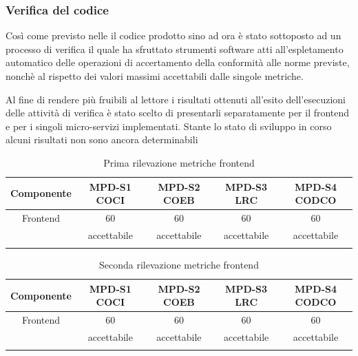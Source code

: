 \subsubsection{Verifica del codice}
Così come previsto nelle  il codice prodotto sino ad ora è stato sottoposto ad un processo di verifica il quale 
ha sfruttato strumenti software atti all'espletamento automatico delle operazioni di accertamento della conformità alle norme previste, nonchè
al rispetto dei valori massimi accettabili dalle singole metriche.

Al fine di rendere più fruibili al lettore i risultati ottenuti all'esito dell'esecuzioni delle attività di verifica è stato scelto di presentarli
separatamente per il frontend e per i singoli micro-servizi implementati. Stante lo stato di sviluppo in corso alcuni risultati non sono ancora determinabili

\begin{center}
    \begin{longtable}{|c|c|c|c|c|}
        \hline
        \rowcolor{lighter-grayer}
        \textbf{Componente}         & \textbf{MPD-S1 COCI}  & \textbf{MPD-S2 COEB} & \textbf{MPD-S3 LRC} & \textbf{MPD-S4 CODCO}\\
        \hline
        \endfirsthead

        \hline
        Frontend & 60 & 60  & 60 & 60                       \\
         & accettabile & accettabile  & accettabile & accettabile                       \\
        
        \hline
        \rowcolor{white}
        \caption{Prima rilevazione metriche frontend}
    \end{longtable}

    \begin{longtable}{|c|c|c|c|c|}
        \hline
        \rowcolor{lighter-grayer}
        \textbf{Componente}         & \textbf{MPD-S1 COCI}  & \textbf{MPD-S2 COEB} & \textbf{MPD-S3 LRC} & \textbf{MPD-S4 CODCO}\\
        \hline
        \endfirsthead

        \hline
        Frontend & 60 & 60  & 60 & 60                       \\
        & accettabile & accettabile  & accettabile & accettabile                       \\

        \hline
        \rowcolor{white}
        \caption{Seconda rilevazione metriche frontend}
    \end{longtable}


\end{center}

